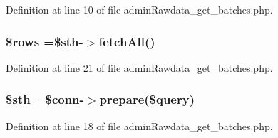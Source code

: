 Definition at line 10 of file admin\-Rawdata\-\_\-get\-\_\-batches.\-php.

\hypertarget{admin_rawdata_2admin_rawdata__get__batches_8php_ace2ec39e7df3899fa8df9640ec274b03}{
\subsubsection[{\$rows}]{\setlength{\rightskip}{0pt plus 5cm}\$rows =\$sth-\/$>$fetch\-All()}}\label{admin_rawdata_2admin_rawdata__get__batches_8php_ace2ec39e7df3899fa8df9640ec274b03}


Definition at line 21 of file admin\-Rawdata\-\_\-get\-\_\-batches.\-php.

\hypertarget{admin_rawdata_2admin_rawdata__get__batches_8php_afa9126f9664959c02795be300a135f93}{
\subsubsection[{\$sth}]{\setlength{\rightskip}{0pt plus 5cm}\$sth =\$conn-\/$>$prepare(\$query)}}\label{admin_rawdata_2admin_rawdata__get__batches_8php_afa9126f9664959c02795be300a135f93}


Definition at line 18 of file admin\-Rawdata\-\_\-get\-\_\-batches.\-php.

